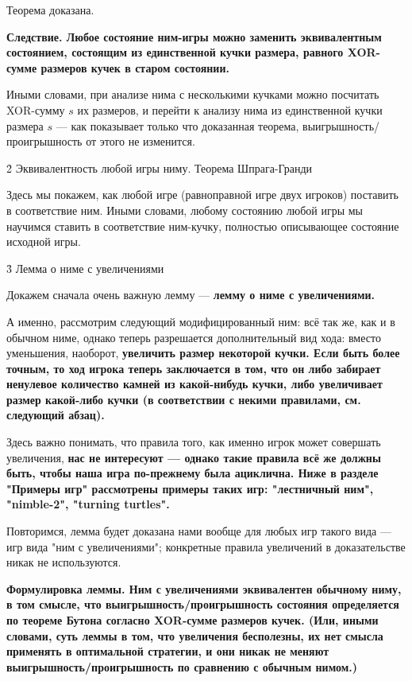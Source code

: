 Теорема доказана.

\bf{Следствие}. Любое состояние ним-игры можно заменить эквивалентным состоянием, состоящим из единственной кучки размера, равного XOR-сумме размеров кучек в старом состоянии.

Иными словами, при анализе нима с несколькими кучками можно посчитать XOR-сумму $s$ их размеров, и перейти к анализу нима из единственной кучки размера $s$ --- как показывает только что доказанная теорема, выигрышность/проигрышность от этого не изменится.


\h2{ Эквивалентность любой игры ниму. Теорема Шпрага-Гранди }

Здесь мы покажем, как любой игре (равноправной игре двух игроков) поставить в соответствие ним. Иными словами, любому состоянию любой игры мы научимся ставить в соответствие ним-кучку, полностью описывающее состояние исходной игры.


\h3{ Лемма о ниме с увеличениями }

Докажем сначала очень важную лемму --- \bf{лемму о ниме с увеличениями}.

А именно, рассмотрим следующий модифицированный ним: всё так же, как и в обычном ниме, однако теперь разрешается дополнительный вид хода: вместо уменьшения, наоборот, \bf{увеличить размер некоторой кучки}. Если быть более точным, то ход игрока теперь заключается в том, что он либо забирает ненулевое количество камней из какой-нибудь кучки, либо увеличивает размер какой-либо кучки (в соответствии с некими правилами, см. следующий абзац).

Здесь важно понимать, что правила того, как именно игрок может совершать увеличения, \bf{нас не интересуют} --- однако такие правила всё же должны быть, чтобы наша игра по-прежнему была \bf{ациклична}. Ниже в разделе "Примеры игр" рассмотрены примеры таких игр: "лестничный ним", "nimble-2", "turning turtles".

Повторимся, лемма будет доказана нами вообще для любых игр такого вида --- игр вида "ним с увеличениями"; конкретные правила увеличений в доказательстве никак не используются.

\bf{Формулировка леммы}. Ним с увеличениями эквивалентен обычному ниму, в том смысле, что выигрышность/проигрышность состояния определяется по теореме Бутона согласно XOR-сумме размеров кучек. (Или, иными словами, суть леммы в том, что увеличения бесполезны, их нет смысла применять в оптимальной стратегии, и они никак не меняют выигрышность/проигрышность по сравнению с обычным нимом.)

